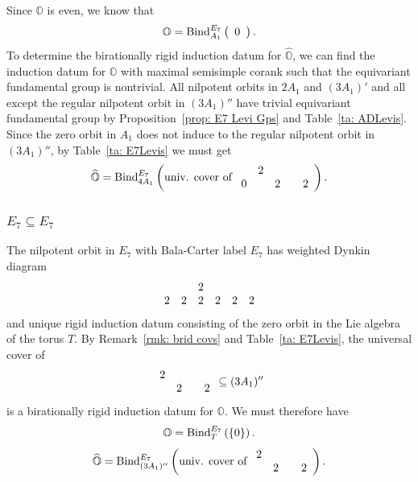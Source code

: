 \documentclass[11pt]{amsart}
\renewcommand{\O}{{\mathbb O}}
\newcommand{\BInd}{{{\mbox{\rm Bind}}}}
\newcommand{\hatO}{\widehat{\O}}
\numberwithin{equation}{section}
\begin{document}
	Since $\O$ is even, we know that $$\O=\BInd_{A_1}^{E_7}\left(\begin{array}{c}
		0 \\
	\end{array}\right).$$ To determine the birationally rigid induction datum for $\hatO$, we can find the induction datum for $\O$ with maximal semisimple corank such that the equivariant fundamental group is nontrivial. All nilpotent orbits in $2A_1$ and $(3A_1)'$ and all except the regular nilpotent orbit in $(3A_1)''$ have trivial equivariant fundamental group by Proposition~\ref{prop: E7 Levi Gps} and Table~\ref{ta: ADLevis}. Since the zero orbit in $A_1$ does not induce to the regular nilpotent orbit in $(3A_1)''$, by Table~\ref{ta: E7Levis} we must get $$\hatO=\BInd_{4 A_1}^{E_7}\left( \mbox{univ. cover of } \begin{array}{c c c c c}
		&  2 & & & \\
		0 & & 2 & & 2 \\
	\end{array}\right).$$
	\fi
	
	\subsubsection{\texorpdfstring{$E_7\subseteq E_7$}{E7 in E7}}\label{sss: E7 in E7}
	
	The nilpotent orbit in $E_7$ with Bala-Carter label $E_7$ has weighted Dynkin diagram $$\begin{array}{c c c c c c}
		& & 2 & & & \\
		2 & 2 & 2 & 2 & 2 & 2 \\
	\end{array}$$ and unique rigid induction datum consisting of the zero orbit in the Lie algebra of the torus $T$. By Remark~\ref{rmk: brid covs} and Table~\ref{ta: E7Levis}, the universal cover of $$\begin{array}{c c c c}
		2 & & & \\
		  & 2 & & 2 \\
	\end{array}\subseteq (3A_1)''$$ is a birationally rigid induction datum for $\O$. We must therefore have
	$$\O = \BInd_{T}^{E_7}\left( \{0\}\right).$$
	$$\hatO = \BInd_{(3A_1)''}^{E_7}\left( \mbox{univ. cover of }\begin{array}{c c c c}
		2 &  & & \\
		 & 2 & & 2 \\
	\end{array} \right).$$
	\iffalse
	
\end{document}

